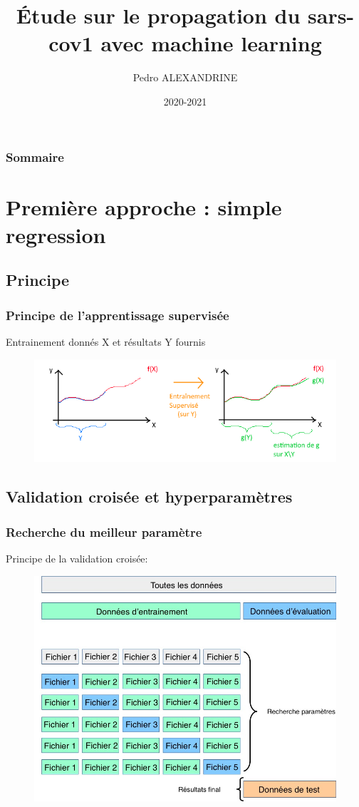 \documentclass{beamer}
\title{Étude sur le propagation du sars-cov1 avec machine learning}
\date{2020-2021}
\institute{numero d'inscription : 41758}
\author{Pedro ALEXANDRINE}
\begin{document}
\begin{frame}
	\maketitle
\end{frame}

\begin{frame}
	\frametitle{Sommaire}
	\tableofcontents
\end{frame}

\section{Première approche : simple regression}
\subsection{Principe}
\begin{frame}
	\frametitle{Principe de l'apprentissage supervisée}%
	Entrainement donnés X et résultats Y fournis
	\begin{figure}[b]
		\centering
		\includegraphics[scale=0.65]{super_schema}
	\end{figure}
\end{frame}

\subsection{Validation croisée et hyperparamètres}
\begin{frame}
	\frametitle{Recherche du meilleur paramètre}
	Principe de la  validation croisée:
	\begin{figure}[b]
		\centering
		\includegraphics[scale=0.27]{gscv}
	\end{figure}
\end{frame}
\end{document}
